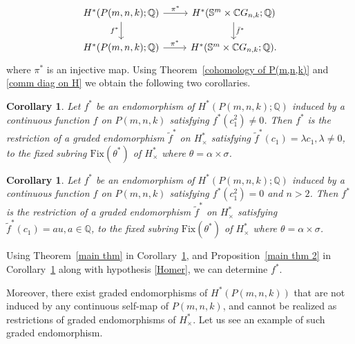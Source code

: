 \documentclass{amsart}
\newtheorem{corollary}[theorem]{Corollary}
\newcommand{\thmref}[1]{Theorem~\ref{#1}}
\newcommand{\propref}[1]{Proposition~\ref{#1}}
\newcommand{\corref}[1]{Corollary~\ref{#1}}
\begin{document}
	\begin{equation}\label{comm diag on H}
		\begin{tikzcd}
			{H^*(P(m,n,k);\mathbb Q)}  & {H^*(\mathbb S^m\times \mathbb CG_{n,k};\mathbb Q)} \\
			{H^*(P(m,n,k);\mathbb Q)} & {H^*(\mathbb S^m\times \mathbb CG_{n,k};\mathbb Q).}
			\arrow["{\pi^*}", from=1-1, to=1-2]
			\arrow["{f^*}"', from=1-1, to=2-1]
			\arrow["{\bar f^*}", from=1-2, to=2-2]
			\arrow["{\pi^*}", from=2-1, to=2-2]
		\end{tikzcd}
	\end{equation}
	where $\pi^*$ is an injective map. Using \thmref{cohomology of P(m,n,k)} and \eqref{comm diag on H} we obtain the following two corollaries. 
	\begin{corollary}\label{cor3}
		Let $f^*$ be an endomorphism of $H^*(P(m,n,k); \mathbb{Q})$ induced by a continuous function $f$ on $P(m,n,k)$ satisfying $f^*(c_1^2) \ne 0$. Then
		$f^*$ is the restriction of a graded endomorphism $\tilde{f}^*$ on  $H^*_\times$ satisfying $\tilde{f}^*(c_1) = \lambda c_1, \lambda \neq 0$,  to the fixed subring $\mathrm{Fix}(\theta^*)$ of $H^*_\times$ where $\theta = \alpha\times \sigma$.
	\end{corollary}
	\begin{corollary}\label{cor4}
		Let $f^*$ be an endomorphism of $H^*(P(m,n,k); \mathbb{Q})$ induced by a continuous function $f$ on $P(m,n,k)$ satisfying $f^*(c_1^2) =0$ and $n>2$. Then
		$f^*$ is the restriction of a graded endomorphism $\tilde{f}^*$ on  $H^*_\times$ satisfying $\tilde{f}^*(c_1) = au, a \in \mathbb{Q}$,  to the fixed subring $\mathrm{Fix}(\theta^*)$ of $H^*_\times$ where $\theta = \alpha\times \sigma$.
	\end{corollary}
	Using \thmref{main thm} in \corref{cor3}, and \propref{main thm 2} in \corref{cor4} along with hypothesis \eqref{Homer}, we can determine $f^*$.
	
	Moreover, there exist graded endomorphisms of $H^*(P(m,n,k))$ that are not induced by any continuous self-map of $P(m,n,k)$, and cannot be realized as restrictions of graded endomorphisms of $H^*_{\times}$. Let us see an example of such graded endomorphism.
	
\end{document}
